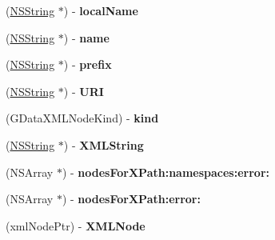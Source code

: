 \begin{DoxyCompactItemize}
\item 
\hypertarget{interface_g_data_x_m_l_node_a503afc6b19e456b831f6b45ae184336c}{
(\hyperlink{class_n_s_string}{NSString} $\ast$) -\/ {\bfseries localName}}
\label{interface_g_data_x_m_l_node_a503afc6b19e456b831f6b45ae184336c}

\item 
\hypertarget{interface_g_data_x_m_l_node_a4dcfed52258221c7387f1482d7ee8488}{
(\hyperlink{class_n_s_string}{NSString} $\ast$) -\/ {\bfseries name}}
\label{interface_g_data_x_m_l_node_a4dcfed52258221c7387f1482d7ee8488}

\item 
\hypertarget{interface_g_data_x_m_l_node_ad243c0aec788b95cb5fa8b6a89707c10}{
(\hyperlink{class_n_s_string}{NSString} $\ast$) -\/ {\bfseries prefix}}
\label{interface_g_data_x_m_l_node_ad243c0aec788b95cb5fa8b6a89707c10}

\item 
\hypertarget{interface_g_data_x_m_l_node_a9d34ab47a4b5e1b3c67b26b07e9956a1}{
(\hyperlink{class_n_s_string}{NSString} $\ast$) -\/ {\bfseries URI}}
\label{interface_g_data_x_m_l_node_a9d34ab47a4b5e1b3c67b26b07e9956a1}

\item 
\hypertarget{interface_g_data_x_m_l_node_a5e033ccdae3236c8875e1c6feb44c949}{
(GDataXMLNodeKind) -\/ {\bfseries kind}}
\label{interface_g_data_x_m_l_node_a5e033ccdae3236c8875e1c6feb44c949}

\item 
\hypertarget{interface_g_data_x_m_l_node_a958c434d973db58ada939d7276977812}{
(\hyperlink{class_n_s_string}{NSString} $\ast$) -\/ {\bfseries XMLString}}
\label{interface_g_data_x_m_l_node_a958c434d973db58ada939d7276977812}

\item 
\hypertarget{interface_g_data_x_m_l_node_a93c2784d84fc245d99cf2943fc41c19c}{
(NSArray $\ast$) -\/ {\bfseries nodesForXPath:namespaces:error:}}
\label{interface_g_data_x_m_l_node_a93c2784d84fc245d99cf2943fc41c19c}

\item 
\hypertarget{interface_g_data_x_m_l_node_a48f3179efdba9b7e017aa32e7118907b}{
(NSArray $\ast$) -\/ {\bfseries nodesForXPath:error:}}
\label{interface_g_data_x_m_l_node_a48f3179efdba9b7e017aa32e7118907b}

\item 
\hypertarget{interface_g_data_x_m_l_node_a775ef8bdbcb26003bfd326930f028d44}{
(xmlNodePtr) -\/ {\bfseries XMLNode}}
\label{interface_g_data_x_m_l_node_a775ef8bdbcb26003bfd326930f028d44}


\end{DoxyCompactItemize}
